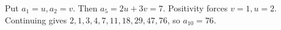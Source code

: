Put $a_1=u,a_2=v$. Then $a_5=2u+3v=7$. Positivity forces $v=1,u=2$. Continuing gives $2,1,3,4,7,11,18,29,47,76$, so $\boxed{a_{10}=76}$.
